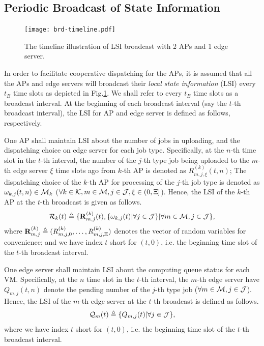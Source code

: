\subsection{Periodic Broadcast of State Information}

\begin{figure}[ht]
    \centering
    \texttt{[image: brd-timeline.pdf]}
    \caption{The timeline illustration of LSI broadcast with 2 APs and 1 edge server.}
    \label{fig:brd-timeline}
\end{figure}

In order to facilitate cooperative dispatching for the APs, it is assumed that all the APs and edge servers will broadcast their \emph{local state information} (LSI) every $t_B$ time slots as depicted in Fig.\ref{fig:brd-timeline}.
We shall refer to every $t_B$ time slots as a broadcast interval.
At the beginning of each broadcast interval (say the $t$-th broadcast interval), the LSI for AP and edge server is defined as follows, respectively.

\begin{definition}
    One AP shall maintain LSI about the number of jobs in uploading, and the dispatching choice on edge server for each job type.
    Specifically, at the $n$-th time slot in the $t$-th interval, the number of the $j$-th type job being uploaded to the $m$-th edge server $\xi$ time slots ago from $k$-th AP is denoted as $R^{(k)}_{m,j,\xi}({t,n})$;
    The dispatching choice of the $k$-th AP for processing of the $j$-th job type is denoted as $\omega_{k,j}(t,n) \in \mathcal{M}_{k}$ ($\forall k\in\mathcal{K}, m\in\mathcal{M}, j\in\mathcal{J}, \xi\in(0,\Xi]$).
    Hence, the LSI of the $k$-th AP at the $t$-th broadcast is given as follows.
    \begin{align}
        \mathcal{R}_{k}({t}) \triangleq \{\mathbf{R}^{(k)}_{m,j}({t}), \{\omega_{k,j}(t)|\forall j\in\mathcal{J}\} | \forall m\in\mathcal{M}, j\in\mathcal{J}\},
    \end{align}
    where $\mathbf{R}^{(k)}_{m,j} \triangleq ( R^{(k)}_{m,j,0},\dots,R^{(k)}_{m,j,\Xi} )$ denotes the vector of random variables for convenience; and we have index $t$ short for $(t, 0)$, i.e. the beginning time slot of the $t$-th broadcast interval.
\end{definition}

\begin{definition}
    One edge server shall maintain LSI about the computing queue status for each VM.
    Specifically, at the $n$ time slot in the $t$-th interval, the $m$-th edge server have $Q_{m,j}({t,n})$ denote the pending number of the $j$-th type job ($\forall m\in\mathcal{M}, j\in\mathcal{J}$).
    Hence, the LSI of the $m$-th edge server at the $t$-th broadcast is defined as follows.
    \begin{align}
        \mathcal{Q}_{m}({t}) \triangleq \{Q_{m,j}({t}) | \forall j\in\mathcal{J}\},
    \end{align}
    where we have index $t$ short for $(t, 0)$, i.e. the beginning time slot of the $t$-th broadcast interval.
\end{definition}

